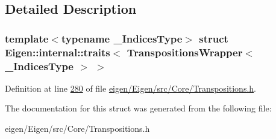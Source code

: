 \subsection{Detailed Description}
\subsubsection*{template$<$typename \+\_\+\+Indices\+Type$>$\newline
struct Eigen\+::internal\+::traits$<$ Transpositions\+Wrapper$<$ \+\_\+\+Indices\+Type $>$ $>$}



Definition at line \hyperlink{eigen_2_eigen_2src_2_core_2_transpositions_8h_source_l00280}{280} of file \hyperlink{eigen_2_eigen_2src_2_core_2_transpositions_8h_source}{eigen/\+Eigen/src/\+Core/\+Transpositions.\+h}.



The documentation for this struct was generated from the following file\+:\begin{DoxyCompactItemize}
\item 
eigen/\+Eigen/src/\+Core/\+Transpositions.\+h\end{DoxyCompactItemize}

